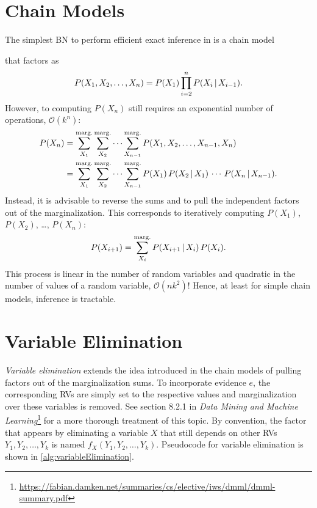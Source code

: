 	\section{Chain Models}
		The simplest BN to perform efficient exact inference in is a chain model
		\begin{center}
		\end{center}
		that factors as
		\begin{equation}
			P(X_1, X_2, \dots, X_n) = P(X_1) \prod_{i = 2}^{n} P(X_i \,\vert\, X_{i - 1}).
		\end{equation}
		However, to computing \(P(X_n)\) still requires an exponential number of operations, \( \mathcal{O}(k^n) \):
		\begin{align}
			P(X_n)
			 & = \sum_{X_1}^{\operatorname{marg.}} \sum_{X_2}^{\operatorname{marg.}} \cdots \sum_{X_{n - 1}}^{\operatorname{marg.}} P(X_1, X_2, \dots, X_{n - 1}, X_n)                                \\
			 & = \sum_{X_1}^{\operatorname{marg.}} \sum_{X_2}^{\operatorname{marg.}} \cdots \sum_{X_{n - 1}}^{\operatorname{marg.}} P(X_1) \, P(X_2 \,\vert\, X_1) \, \cdots \, P(X_n \,\vert\, X_{n - 1}).
		\end{align}
		Instead, it is advisable to reverse the sums and to pull the independent factors out of the marginalization. This corresponds to iteratively computing \( P(X_1) \), \( P(X_2) \), \dots, \( P(X_n) \):
		\begin{equation}
			P(X_{i + 1}) = \sum_{X_i}^{\operatorname{marg.}} P(X_{i + 1} \,\vert\, X_i) \, P(X_i).
		\end{equation}
		This process is linear in the number of random variables and quadratic in the number of values of a random variable, \( \mathcal{O}(nk^2) \)! Hence, at least for simple chain models, inference is tractable.

	\section{Variable Elimination}
		\label{sec:variableElimination}

		\emph{Variable elimination} extends the idea introduced in the chain models of pulling factors out of the marginalization sums. To incorporate evidence \(e\), the corresponding RVs are simply set to the respective values and marginalization over these variables is removed. See section 8.2.1 in \emph{Data Mining and Machine Learning}\footnote{\url{https://fabian.damken.net/summaries/cs/elective/iws/dmml/dmml-summary.pdf}} for a more thorough treatment of this topic. By convention, the factor that appears by eliminating a variable \(X\) that still depends on other RVs \( Y_1, Y_2, \dots, Y_k \) is named \( f_X(Y_1, Y_2, \dots, Y_k) \). Pseudocode for variable elimination is shown in \autoref{alg:variableElimination}.

